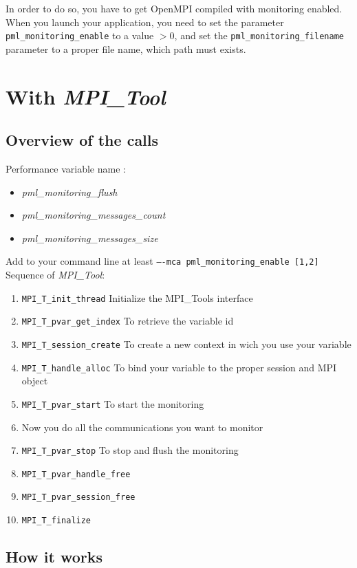 \documentclass[notitlepage]{article}
\newcommand{\mpit}[1]{\textit{MPI\_Tool#1}}
\begin{document}
In order to do so, you have to get OpenMPI compiled with monitoring
enabled. When you launch your application, you need to set the
parameter \texttt{pml\_monitoring\_enable} to a value $> 0$, and set
the \texttt{pml\_monitoring\_filename} parameter to a proper file name,
which path must exists.

\section{With \mpit{}}

\subsection{Overview of the calls}

Performance variable name :
\begin{itemize}
\item \textit{pml\_monitoring\_flush}
\item \textit{pml\_monitoring\_messages\_count}
\item \textit{pml\_monitoring\_messages\_size}
\end{itemize}
Add to your command line at least \texttt{----mca pml\_monitoring\_enable [1,2]} \\
Sequence of \mpit{}:
\begin{enumerate}
\item {\texttt{MPI\_T\_init\_thread}} Initialize the MPI\_Tools
  interface
\item {\texttt{MPI\_T\_pvar\_get\_index}} To retrieve the variable id
\item {\texttt{MPI\_T\_session\_create}} To create a new context
  in wich you use your variable
\item {\texttt{MPI\_T\_handle\_alloc}} To bind your variable to the
  proper session and MPI object
\item {\texttt{MPI\_T\_pvar\_start}} To start the monitoring
\item Now you do all the communications you want to monitor
\item {\texttt{MPI\_T\_pvar\_stop}} To stop and flush the monitoring
\item {\texttt{MPI\_T\_pvar\_handle\_free}}
\item {\texttt{MPI\_T\_pvar\_session\_free}}
\item {\texttt{MPI\_T\_finalize}}
\end{enumerate}

\subsection{How it works}
\end{document}
